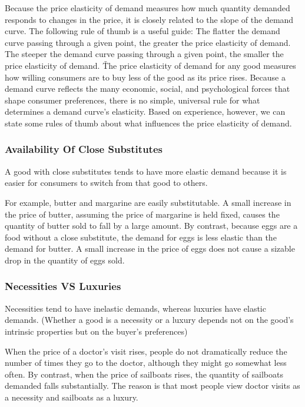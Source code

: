 
Because the price elasticity of demand measures how much quantity demanded responds to changes in the price, it is
closely related to the slope of the demand curve. The following rule of thumb is a useful guide: The flatter the
demand curve passing through a given point, the greater the price elasticity of demand. The steeper the demand curve
passing through a given point, the smaller the price elasticity of demand. \v

The price elasticity of demand for any good measures how willing consumers are to buy less of the good as its price
rises. Because a demand curve reflects the many economic, social, and psychological forces that shape consumer
preferences, there is no simple, universal rule for what determines a demand curve's elasticity. Based on experience,
however, we can state some rules of thumb about what influences the price elasticity of demand.

\subsubsection*{Availability Of Close Substitutes}

A good with close substitutes tends to have more elastic demand because it is easier for consumers to switch from
that good to others.

\be
For example, butter and margarine are easily substitutable. A small increase in the price of butter, assuming the
price of margarine is held fixed, causes the quantity of butter sold to fall by a large amount. By contrast, because
eggs are a food without a close substitute, the demand for eggs is less elastic than the demand for butter. A small
increase in the price of eggs does not cause a sizable drop in the quantity of eggs sold.
\ee

\subsubsection*{Necessities VS Luxuries}

Necessities tend to have inelastic demands, whereas luxuries have elastic demands. (Whether a good is a necessity or
a luxury depends not on the good's intrinsic properties but on the buyer's preferences)

\be
When the price of a doctor's visit rises, people do not dramatically reduce the number of times they go to the
doctor, although they might go somewhat less often. By contrast, when the price of sailboats rises, the quantity of
sailboats demanded falls substantially. The reason is that most people view doctor visits as a necessity and
sailboats as a luxury.
\ee

